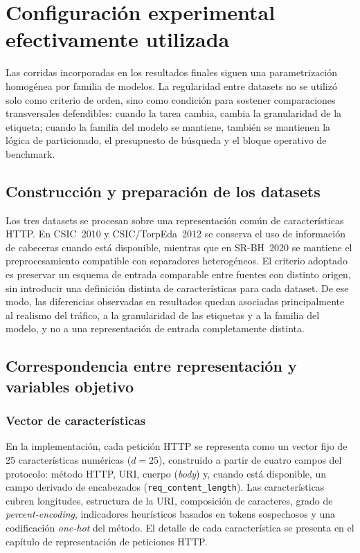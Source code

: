 \documentclass[12pt,oneside]{report}
\begin{document}
\section{Configuración experimental efectivamente utilizada}
Las corridas incorporadas en los resultados finales siguen una parametrización homogénea por familia de modelos. La regularidad entre datasets no se utilizó solo como criterio de orden, sino como condición para sostener comparaciones transversales defendibles: cuando la tarea cambia, cambia la granularidad de la etiqueta; cuando la familia del modelo se mantiene, también se mantienen la lógica de particionado, el presupuesto de búsqueda y el bloque operativo de benchmark.

\subsection{Construcción y preparación de los datasets}
Los tres datasets se procesan sobre una representación común de características HTTP. En CSIC~2010 y CSIC/TorpEda~2012 se conserva el uso de información de cabeceras cuando está disponible, mientras que en SR-BH~2020 se mantiene el preprocesamiento compatible con separadores heterogéneos. El criterio adoptado es preservar un esquema de entrada comparable entre fuentes con distinto origen, sin introducir una definición distinta de características para cada dataset. De ese modo, las diferencias observadas en resultados quedan asociadas principalmente al realismo del tráfico, a la granularidad de las etiquetas y a la familia del modelo, y no a una representación de entrada completamente distinta.

\subsection{Correspondencia entre representación y variables objetivo}

\subsubsection{Vector de características}
En la implementación, cada petición HTTP se representa como un vector fijo de 25 características numéricas ($d = 25$), construido a partir de cuatro campos del protocolo: método HTTP, URI, cuerpo (\textit{body}) y, cuando está disponible, un campo derivado de encabezados (\texttt{req\_content\_length}). Las características cubren longitudes, estructura de la URI, composición de caracteres, grado de \textit{percent-encoding}, indicadores heurísticos basados en tokens sospechosos y una codificación \textit{one-hot} del método. El detalle de cada característica se presenta en el capítulo de representación de peticiones HTTP.
\end{document}
